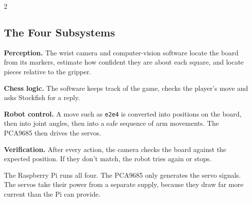 \documentclass[10pt,a4paper]{article}
\begin{document}
\begin{multicols}{2}
\subsection{The Four Subsystems}
\textbf{Perception.} The wrist camera and computer-vision software locate the board from its
markers, estimate how confident they are about each square, and locate pieces relative to the gripper.

\textbf{Chess logic.} The software keeps track of the game, checks the player's move and asks
Stockfish for a reply.

\textbf{Robot control.} A move such as \texttt{e2e4} is converted into positions on the board, then
into joint angles, then into a safe sequence of arm movements. The PCA9685 then drives the servos.

\columnbreak
\textbf{Verification.} After every action, the camera checks the board against the expected
position. If they don't match, the robot tries again or stops.

The Raspberry Pi runs all four. The PCA9685 only generates the servo signals. The servos take
their power from a separate supply, because they draw far more current than the Pi can provide.
\end{multicols}
\end{document}
